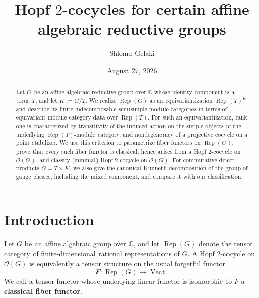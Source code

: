 \documentclass{amsart}
\theoremstyle{definition}
\newcommand{\Rep}{\operatorname{Rep}}
\newcommand{\Vect}{\operatorname{Vect}}
\numberwithin{equation}{section}
\begin{document}
\title[Hopf $2$-cocycles for certain reductive groups]
{Hopf $2$-cocycles for certain affine algebraic reductive groups}

\author{Shlomo Gelaki}
\address{Department of Mathematics, Iowa State University, Ames, IA 50011, USA}

\date{August 27, 2026}


\begin{abstract}
Let $G$ be an affine algebraic reductive group over $\mathbb{C}$ whose identity
component is a torus $T$, and let $K:=G/T$.  We realize $\Rep(G)$ as an
equivariantization $\Rep(T)^K$ and describe its finite indecomposable semisimple
module categories in terms of equivariant module-category data over $\Rep(T)$.
For such an equivariantization, rank one is characterized by transitivity of the
induced action on the simple objects of the underlying $\Rep(T)$-module category,
and nondegeneracy of a projective cocycle on a point stabilizer.  We use this
criterion to parametrize fiber functors on $\Rep(G)$, prove that every such
fiber functor is classical, hence arises from a Hopf $2$-cocycle on
$\mathscr{O}(G)$, and classify (minimal) Hopf $2$-cocycle on
$\mathscr{O}(G)$. For commutative direct products $G=T\times K$, we also give the
canonical K\"unneth decomposition of the group of gauge classes, including the
mixed component, and compare it with our classification.
\end{abstract}

\maketitle
\tableofcontents

\section{Introduction}\label{sec:introduction}

Let $G$ be an affine algebraic group over $\mathbb{C}$, and let $\Rep(G)$ denote
the tensor category of finite-dimensional rational representations of $G$.
A Hopf $2$-cocycle on $\mathscr{O}(G)$ is equivalently a tensor structure on the
usual forgetful functor
\[
 F:\Rep(G)\longrightarrow \Vect.
\]
We call a tensor functor whose underlying linear functor is isomorphic to $F$ a
{\bf classical fiber functor}.
\end{document}
